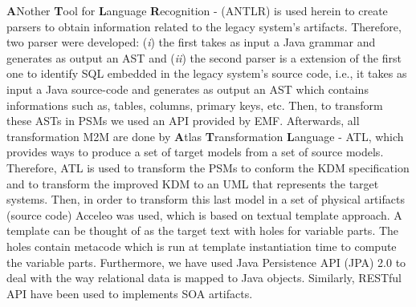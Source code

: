 \textbf{A}Nother \textbf{T}ool for \textbf{L}anguage \textbf{R}ecognition -  (ANTLR) is used herein to create parsers to obtain information related to the legacy system's artifacts. Therefore, two parser were developed: (\textit{i}) the first takes as input a Java grammar and generates as output an AST and (\textit{ii}) the second parser is a extension of the first one to identify SQL embedded in the legacy system's source code, i.e., it takes as input a Java source-code and generates as output an AST which contains informations such as, tables, columns, primary keys, etc. Then, to transform these ASTs in PSMs we used an API provided by EMF. Afterwards, all transformation M2M are done by \textbf{A}tlas \textbf{T}ransformation \textbf{L}anguage - ATL, which provides ways to produce a set of target models from a set of source models. Therefore, ATL is used to transform the PSMs to conform the KDM specification and to transform the improved KDM to an UML that represents the target systems. Then, in order to transform this last model in a set of physical artifacts (source code) Acceleo was used, which is based on textual template approach. A template can be thought of as the target text with holes for variable parts. The holes contain metacode which is run at template instantiation time to compute the variable parts. Furthermore, we have used Java Persistence API (JPA) 2.0 to deal with the way relational data is mapped to Java objects. Similarly, RESTful API have been used to implements SOA artifacts.


 




